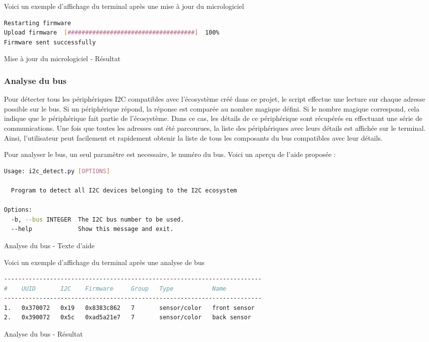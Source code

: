 Voici un exemple d'affichage du terminal après une mise à jour du micrologiciel

\begin{listing}[!h]
    \begin{lstlisting}[language=bash]
Restarting firmware
Upload firmware  [####################################]  100%
Firmware sent successfully
    \end{lstlisting}
    \caption{Mise à jour du micrologiciel - Résultat}
\end{listing}

\subsubsection{Analyse du bus}

Pour détecter tous les périphériques I2C compatibles avec l'écosystème créé dans ce projet, le script effectue une lecture sur chaque adresse possible sur le bus.
Si un périphérique répond, la réponse est comparée au nombre magique défini.
Si le nombre magique correspond, cela indique que le périphérique fait partie de l'écosystème.
Dans ce cas, les détails de ce périphérique sont récupérés en effectuant une série de communications.
Une fois que toutes les adresses ont été parcourues, la liste des périphériques avec leurs détails est affichée sur le terminal.
Ainsi, l'utilisateur peut facilement et rapidement obtenir la liste de tous les composants du bus compatibles avec leur détails.

Pour analyser le bus, un seul paramètre est necessaire, le numéro du bus. Voici un aperçu de l'aide proposée :

\begin{listing}[!h]
    \begin{lstlisting}[language=bash]
Usage: i2c_detect.py [OPTIONS]

  Program to detect all I2C devices belonging to the I2C ecosystem

Options:
  -b, --bus INTEGER  The I2C bus number to be used.
  --help             Show this message and exit.
    \end{lstlisting}
    \caption{Analyse du bus - Texte d'aide}
\end{listing}

Voici un exemple d'affichage du terminal après une analyse de bus

\begin{listing}[!h]
    \begin{lstlisting}[language=bash]
-------------------------------------------------------------------------
#    UUID       I2C    Firmware     Group   Type           Name
-------------------------------------------------------------------------
1.   0x370072   0x19   0x8383c862   7       sensor/color   front sensor
2.   0x390072   0x5c   0xad5a21e7   7       sensor/color   back sensor
    \end{lstlisting}
    \caption{Analyse du bus - Résultat}
\end{listing}


